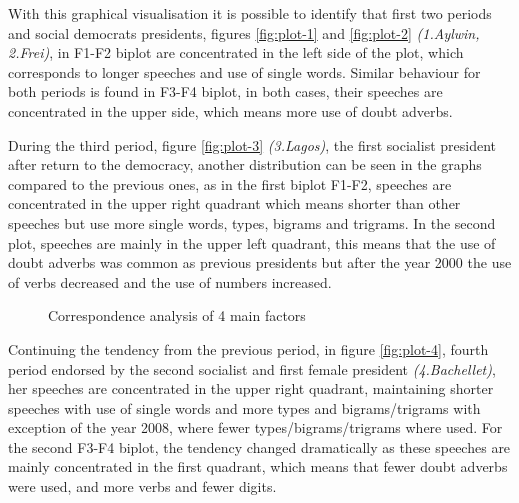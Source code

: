 \documentclass[
  12pt,
]{article}
\begin{document}
With this graphical visualisation it is possible to identify that first two periods and social democrats presidents, figures \ref{fig:plot-1} and \ref{fig:plot-2} \emph{(1.Aylwin, 2.Frei)}, in F1-F2 biplot are concentrated in the left side of the plot, which corresponds to longer speeches and use of single words. Similar behaviour for both periods is found in F3-F4 biplot, in both cases, their speeches are concentrated in the upper side, which means more use of doubt adverbs.

During the third period, figure \ref{fig:plot-3} \emph{(3.Lagos)}, the first socialist president after return to the democracy, another distribution can be seen in the graphs compared to the previous ones, as in the first biplot F1-F2, speeches are concentrated in the upper right quadrant which means shorter than other speeches but use more single words, types, bigrams and trigrams. In the second plot, speeches are mainly in the upper left quadrant, this means that the use of doubt adverbs was common as previous presidents but after the year 2000 the use of verbs decreased and the use of numbers increased.

\begin{figure}[H]
\newline{}\newline{}\newline{}\newline
\end{figure}

\begin{figure}[H]
\newline{}\newline{}\caption{Correspondence analysis of 4 main factors}\label{fig:plot}
\end{figure}

Continuing the tendency from the previous period, in figure \ref{fig:plot-4}, fourth period endorsed by the second socialist and first female president \emph{(4.Bachellet)}, her speeches are concentrated in the upper right quadrant, maintaining shorter speeches with use of single words and more types and bigrams/trigrams with exception of the year 2008, where fewer types/bigrams/trigrams where used. For the second F3-F4 biplot, the tendency changed dramatically as these speeches are mainly concentrated in the first quadrant, which means that fewer doubt adverbs were used, and more verbs and fewer digits.
\end{document}
